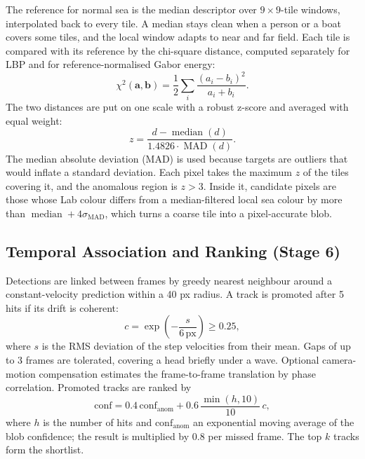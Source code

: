 \documentclass[conference,a4paper]{IEEEtran}
\begin{document}
The reference for normal sea is the median descriptor over $9\times9$-tile windows, interpolated back to every tile. A median stays clean when a person or a boat covers some tiles, and the local window adapts to near and far field. Each tile is compared with its reference by the chi-square distance, computed separately for LBP and for reference-normalised Gabor energy:
\begin{equation}
\chi^2(\mathbf{a}, \mathbf{b}) = \frac{1}{2} \sum_i \frac{(a_i - b_i)^2}{a_i + b_i}.
\end{equation}
The two distances are put on one scale with a robust z-score and averaged with equal weight:
\begin{equation}
z = \frac{d - \operatorname{median}(d)}{1.4826 \cdot \operatorname{MAD}(d)}.
\end{equation}
The median absolute deviation (MAD) is used because targets are outliers that would inflate a standard deviation. Each pixel takes the maximum $z$ of the tiles covering it, and the anomalous region is $z > 3$. Inside it, candidate pixels are those whose Lab colour differs from a median-filtered local sea colour by more than $\operatorname{median} + 4\sigma_{\mathrm{MAD}}$, which turns a coarse tile into a pixel-accurate blob.

\subsection{Temporal Association and Ranking (Stage 6)}

Detections are linked between frames by greedy nearest neighbour around a constant-velocity prediction within a 40 px radius. A track is promoted after 5 hits if its drift is coherent:
\begin{equation}
c = \exp\!\left(-\frac{s}{6\,\mathrm{px}}\right) \geq 0.25,
\end{equation}
where $s$ is the RMS deviation of the step velocities from their mean. Gaps of up to 3 frames are tolerated, covering a head briefly under a wave. Optional camera-motion compensation estimates the frame-to-frame translation by phase correlation. Promoted tracks are ranked by
\begin{equation}
\mathrm{conf} = 0.4\,\mathrm{conf}_{\mathrm{anom}} + 0.6\,\frac{\min(h, 10)}{10}\,c,
\end{equation}
where $h$ is the number of hits and $\mathrm{conf}_{\mathrm{anom}}$ an exponential moving average of the blob confidence; the result is multiplied by 0.8 per missed frame. The top $k$ tracks form the shortlist.
\end{document}
